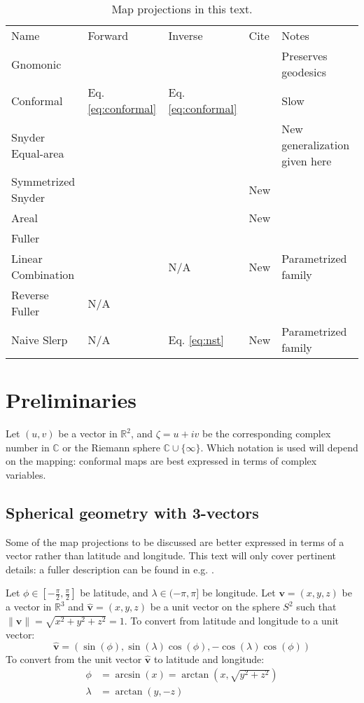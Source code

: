 \documentclass{amsart}[12pt]
\begin{document}
\begin{table}
\begin{tabular}[]{p{3.5cm}|p{1.4cm}p{1.4cm}p{1cm}p{7cm}}
  Name & Forward & Inverse & Cite & Notes \\
  Gnomonic & & & \cite{snyder87} & Preserves geodesics  \\
  Conformal & Eq. \ref{eq:conformal} & Eq. \ref{eq:conformal} & \cite{nehari57}\cite{nehari65}& Slow\\
  Snyder Equal-area & & & \cite{snyder92} & New generalization given here\\
  Symmetrized Snyder & & & New & \\
  Areal & & & New &\\
  Fuller & & & \cite{gray94}\cite{gray95} &\\
  Linear Combination & & N/A & New & Parametrized family\\
  Reverse Fuller & N/A & & \cite{kenner} &\\
  Naive Slerp & N/A & Eq. \ref{eq:nst}  & New & Parametrized family\\
\end{tabular}
\caption{Map projections in this text.}
\label{fig:projs}
\end{table}

\section{Preliminaries}
Let $(u,v)$ be a vector in $\mathbb R^2$, and $\zeta = u + i v$ be the
corresponding complex number in $\mathbb C$ or the Riemann sphere $\mathbb C
\cup \{\infty\}$. Which notation is used will depend on the mapping:
conformal maps are best expressed in terms of complex variables.

\subsection{Spherical geometry with 3-vectors}
Some of the map projections to be discussed are better expressed
in terms of a vector rather than latitude and longitude. This text will only
cover pertinent details: a fuller description can be found in e.g. \cite{strang80}.

Let $\phi \in [-\frac{\pi}{2}, \frac{\pi}{2}]$ be latitude, and
$\lambda \in (-\pi, \pi]$ be longitude. Let $\mathbf v = (x, y, z)$ be a vector
in $\mathbb R^3$ and $\mathbf{\hat{v}} = (x, y, z)$ be a unit vector on the
sphere $S^2$ such that $\| \mathbf{\hat{v}} \| = \sqrt{x^2 + y^2 +z^2} = 1$.
To convert from latitude and longitude to a unit vector:
\begin{equation}
  \mathbf{\hat{v}} = \left(\sin (\phi), \sin (\lambda) \cos (\phi),
  -\cos (\lambda) \cos (\phi) \right)
\end{equation}
To convert from the unit vector $\mathbf{\hat{v}}$ to latitude and longitude:
\begin{equation}\begin{split}
  \phi &= \arcsin (x) = \arctan (x, \sqrt{y^2 + z^2}) \\
  \lambda &= \arctan (y, -z)
\end{split}\end{equation}
\end{document}
